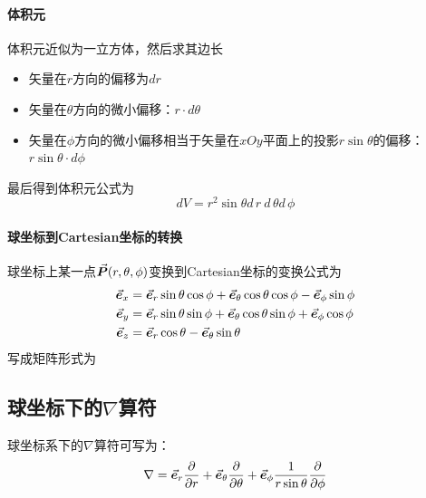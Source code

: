 \paragraph*{体积元}
体积元近似为一立方体，然后求其边长
\begin{itemize}
    \item 矢量在$r$方向的偏移为$dr$
    \item 矢量在$\theta$方向的微小偏移：$r\cdot  d\theta$
    \item 矢量在$\phi$方向的微小偏移相当于矢量在$xOy$平面上的投影$r\sin{\theta}$的偏移：$r\sin\theta\cdot d\phi$
\end{itemize}
最后得到体积元公式为
\begin{equation}
    dV = r^2 \sin{\theta} d\,r\ d\,\theta d\,\phi
\end{equation}

\paragraph*{球坐标到Cartesian坐标的转换}
球坐标上某一点$\vec{\bm{P}}(r, \theta, \phi)$变换到Cartesian坐标的变换公式为
\begin{equation}
    \begin{aligned}
        \vec{\bm{e}}_{x} 
       &= \vec{\bm{e}}_{r}\sin\theta\cos\phi + \vec{\bm{e}}_{\theta}\cos\theta\cos\phi - \vec{\bm{e}}_{\phi}\sin{\phi} \\
        \vec{\bm{e}}_{y} 
       &= \vec{\bm{e}}_{r}\sin\theta\sin\phi + \vec{\bm{e}}_{\theta}\cos\theta\sin\phi + \vec{\bm{e}}_{\phi}\cos{\phi} \\
        \vec{\bm{e}}_{z} 
       &= \vec{\bm{e}}_{r}\cos\theta - \vec{\bm{e}}_{\theta}\sin\theta
    \end{aligned}
    \label{eq:sphere-to-cartesian}
\end{equation}
写成矩阵形式为


\subsection{球坐标下的\texorpdfstring{$\nabla$}{}算符}
球坐标系下的$\nabla$算符可写为：
\begin{equation}
    \nabla =  \vec{\bm{e}}_r \frac{\partial}{\partial r} 
            + \vec{\bm{e}}_\theta \frac{\partial}{\partial \theta}
            + \vec{\bm{e}}_\phi \frac{1}{r\sin{\theta}} \frac{\partial}{\partial \phi}
    \label{eq:nabla-sphere-form}
\end{equation}

